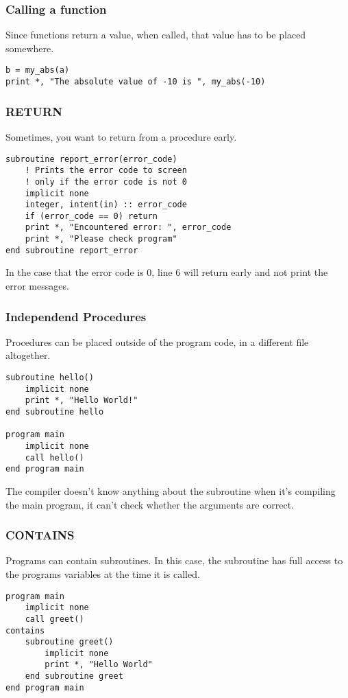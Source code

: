 \begin{frame}[fragile]
  \frametitle{Calling a function}

  Since functions return a value, when called, that value
  has to be placed somewhere.

  \begin{lstlisting}[numbers=none]
b = my_abs(a)
print *, "The absolute value of -10 is ", my_abs(-10)
  \end{lstlisting}

\end{frame}

\begin{frame}[fragile]
  \frametitle{RETURN}

  Sometimes, you want to return from a procedure early.

  \begin{lstlisting}
subroutine report_error(error_code)
    ! Prints the error code to screen
    ! only if the error code is not 0
    implicit none
    integer, intent(in) :: error_code
    if (error_code == 0) return
    print *, "Encountered error: ", error_code
    print *, "Please check program"
end subroutine report_error
  \end{lstlisting}

  In the case that the error code is 0, line 6 will return early and not print
  the error messages.
\end{frame}

\begin{frame}[fragile]
  \frametitle{Independend Procedures}

  Procedures can be placed outside of the program code, in a different file altogether.

  \begin{lstlisting}
subroutine hello()
    implicit none
    print *, "Hello World!"
end subroutine hello

program main
    implicit none
    call hello()
end program main
  \end{lstlisting}

The compiler doesn't know anything about the subroutine when it's compiling the main program, it can't check whether the arguments are correct.

\end{frame}

\begin{frame}[fragile]
  \frametitle{CONTAINS}

Programs can contain subroutines.
In this case, the subroutine has full access to the programs variables at the time
it is called.

  \begin{lstlisting}
program main
    implicit none
    call greet()
contains
    subroutine greet()
        implicit none
        print *, "Hello World"
    end subroutine greet
end program main
  \end{lstlisting}

\end{frame}

